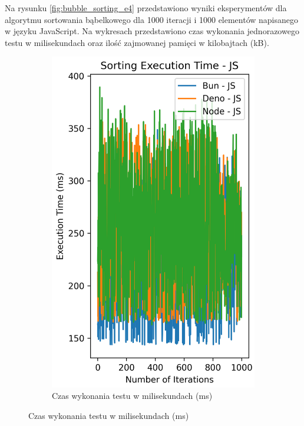 Na rysunku \ref{fig:bubble_sorting_e4} przedstawiono wyniki eksperymentów dla algorytmu sortowania bąbelkowego dla 1000 iteracji i 1000 elementów napisanego w języku JavaScript. Na wykresach przedstawiono czas wykonania jednorazowego testu w milisekundach oraz ilość zajmowanej pamięci w kilobajtach (kB).

\begin{figure}[H]
  \centering
  \begin{subfigure}[b]{0.42\textwidth}
    \centering
    \includegraphics[width=\textwidth]{Figures/sorting/sorting_bubble_1000_10000_js_time.png}
    \caption{Czas wykonania testu w milisekundach (ms)}
    \label{fig:bubble_sorting_e4_time}

\end{subfigure}
\end{figure}
